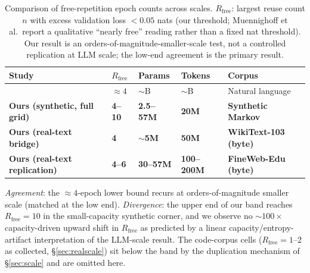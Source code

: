 \documentclass[11pt]{article}
\begin{document}
\begin{table}[htbp]
\centering
\caption{Comparison of free-repetition epoch counts across scales.
$R_{\mathrm{free}}$: largest reuse count $n$ with excess validation loss $<0.05$ nats
(our threshold; Muennighoff et al.\ report a qualitative ``nearly free'' reading
rather than a fixed nat threshold).
Our result is an orders-of-magnitude-smaller-scale test, not a controlled
replication at LLM scale; the low-end agreement is the primary result.}
\label{tab:prior-work}
\scriptsize
\begin{tabular}{@{}lllll@{}}
\toprule
Study & $R_{\mathrm{free}}$ & Params & Tokens & Corpus \\
\midrule
\citet{muennighoff2023scaling}  & ${\approx}4$ & ${\sim}$B & ${\sim}$B & Natural language \\
\textbf{Ours (synthetic, full grid)} & \textbf{4--10} & \textbf{2.5--57M} & \textbf{20M} & \textbf{Synthetic Markov} \\
\textbf{Ours (real-text bridge)}     & \textbf{4}    & \textbf{${\sim}$5M}  & \textbf{50M} & \textbf{WikiText-103 (byte)} \\
\textbf{Ours (real-text replication)} & \textbf{4--6} & \textbf{30--57M} & \textbf{100--200M} & \textbf{FineWeb-Edu (byte)} \\
\bottomrule
\end{tabular}
\vspace{2pt}

\noindent\textit{Agreement}: the ${\approx}4$-epoch lower bound recurs at
orders-of-magnitude smaller scale (matched at the low end). \textit{Divergence}: the upper end of our band
reaches $R_{\mathrm{free}}=10$ in the small-capacity synthetic corner, and we observe no
${\sim}100\times$ capacity-driven upward shift in $R_{\mathrm{free}}$ as predicted
by a linear capacity/entropy-artifact interpretation of the LLM-scale result. The
code-corpus cells ($R_{\mathrm{free}}=1$--$2$ as collected, \S\ref{sec:realscale})
sit below the band by the duplication mechanism of \S\ref{sec:scale} and are
omitted here.
\end{table}
\end{document}
